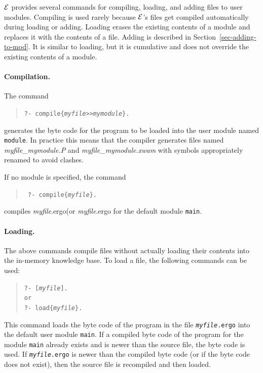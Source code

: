 \documentclass[11pt]{article}
\newcommand{\ERGO}{\mbox{\ensuremath{\cal{E}}\smaller{{\sc{RGO}}}}\xspace}
\newcommand{\FLSYSTEM}{\ERGO}
\newcommand{\ergoext}{ergo\xspace}
\newcommand{\ofile}{xwam}
\begin{document}
\FLSYSTEM provides several commands for compiling, loading, and adding
files to user modules. 
Compiling is used rarely because \FLSYSTEM's files get compiled
automatically during loading or adding.
Loading erases the existing contents of a module and replaces it with the
contents of a file.
Adding is described in Section~\ref{sec-adding-to-mod}.
It is similar to loading, but it is cumulative and does not
override the existing contents of a module. 

\paragraph{Compilation.}
The command 
\begin{quote}
  {\tt ?- compile\{{\it myfile}>{}>{\it mymodule}\}.}
\end{quote}
generates the byte code for the program to be loaded into the user module
named {\tt module}. In
practice this means that the compiler generates files named
\emph{myfile\_mymodule.P} and \emph{myfile\_mymodule.\ofile} with symbols appropriately
renamed to avoid clashes.

If no module is specified, the command
\begin{quote}
 \tt
 ?- compile\{{\it myfile}\}.
\end{quote}
compiles {\it myfile}.\ergoext (or \textit{myfile}.\ergoext for the default module {\tt main}.


\paragraph{Loading.}
%
The above commands compile files without actually loading their contents
into the in-memory knowledge base. 
To load a file, the following commands can be used:
\index{\tt [file]}
\begin{quote}
 \tt ?- [\textit{myfile}].  
 \\
 or
 \\
 \tt ?- load\{\textit{myfile}\}.
\end{quote}
This command loads the byte code of the program in the file {\tt \textit{myfile}.\ergoext} into the default user
module {\tt main}. If a compiled byte code of the program for the module
{\tt main} already exists and is newer than the source file, the byte code
is used.  If {\tt \textit{myfile}.\ergoext} is newer than the compiled byte code (or if
the byte code does not exist), then
the source file is recompiled and then loaded.
\end{document}
